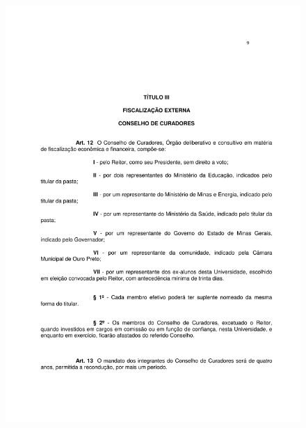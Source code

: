 \begin{figure}[p]
	\centering 
	\includegraphics[scale=0.7]{capitulos/resolucoes/cuni414/cuni414-9.pdf}
\end{figure} \pagebreak

